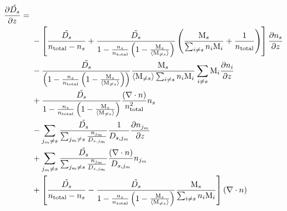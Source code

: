 \begin{equation}
\begin{split}
\frac{\partial\tilde{D_s}}{\partial z}  = &\; \\
    &\;  - \left[\frac{\tilde{D_s}}{n_\text{total} - n_s}
         + \frac{\tilde{D_s}}{1-\frac{n_s}{n_\text{total}}\left(1 - \frac{\text{M}_s}{\langle\text{M}_{\neq s}\rangle}\right)}
                  \left( \frac{\text{M}_s}{\sum_{i\neq s}n_i\text{M}_i} + \frac{1}{n_\text{total}}\right)\right]
                 \frac{\partial n_s}{\partial z}\\
    &\; - \frac{\tilde{D_s}}{\left(1-\frac{n_s}{n_\text{total}}\left(1 - \frac{\text{M}_s}{\langle\text{M}_{\neq s}\rangle}\right)\right)}
           \frac{\text{M}_s}{\langle\text{M}_{\neq s}\rangle\sum_{i\neq s}n_i\text{M}_i} \sum_{i\neq s} \text{M}_i\frac{\partial n_i}{\partial z} \\
    &\; + \frac{\tilde{D_s}}{1-\frac{n_s}{n_\text{total}}\left(1 - \frac{\text{M}_s}{\langle\text{M}_{\neq s}\rangle}\right)}
               \frac{\left(\nabla\cdot{\ensuremath{n}}\right)}{n_\text{total}^2} 
           n_s\\
    &\; - \sum_{j_m\neq s}\frac{\tilde{D_s}}{\sum_{j_m \neq s}\frac{n_{j_m}}{D_{s,j_m}}}
                                \frac{1}{D_{s,j_m}} \frac{\partial n_{j_m}}{\partial z} \\
    &\; +  \sum_{j_m\neq s}\frac{\tilde{D_s}}{\sum_{j_m \neq s}\frac{n_{j_m}}{D_{s,j_m}}} 
                                \frac{\left(\nabla\cdot{\ensuremath{n}}\right)}{D_{s,j_m}}n_{j_m} \\
    &\; + \left[\frac{\tilde{D_s}}{n_\text{total} - n_s}
              - \frac{\tilde{D_s}}{1-\frac{n_s}{n_\text{total}}\left(1 - \frac{\text{M}_s}{\langle\text{M}_{\neq s}\rangle}\right)}
                \frac{\text{M}_s}{\sum_{i\neq s}n_i\text{M}_i}
          \right]
           \left(\nabla\cdot{\ensuremath{n}}\right)\\
\end{split}
\end{equation}


